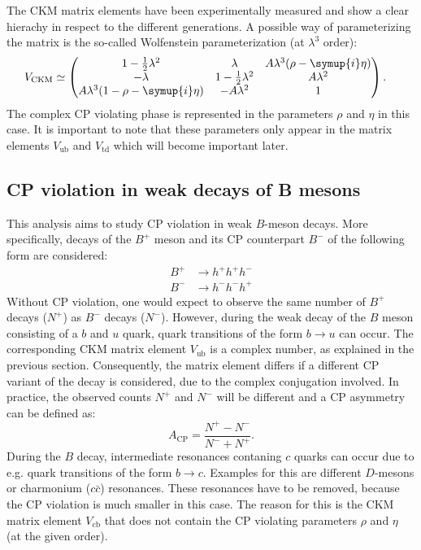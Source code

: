 The CKM matrix elements have been experimentally measured and show a clear hierachy in respect to the different generations. A possible way of parameterizing the matrix
is the so-called Wolfenstein parameterization (at $\lambda^3$ order):
\begin{align*}
    V_{\text{CKM}} & \simeq
    \begin{pmatrix}
        1-\frac{1}{2}\lambda^2 & \lambda & A\lambda^3(\rho-\symup{i}\eta) \\
        -\lambda & 1-\frac{1}{2}\lambda^2 & A\lambda^2 \\
        A\lambda^3(1-\rho-\symup{i}\eta) & -A\lambda^2 & 1 \\
    \end{pmatrix}.
\end{align*}
The complex CP violating phase is represented in the parameters $\rho$ and $\eta$ in this case. It is important to note that these parameters only appear in the matrix elements
$V_{\text{ub}}$ and $V_{\text{td}}$ which will become important later.

\subsection{CP violation in weak decays of B mesons}

This analysis aims to study CP violation in weak $B$-meson decays. More specifically, decays of the $B^+$ meson and its CP counterpart $B^-$ of the following form
are considered:
\begin{align*}
    B^+ &\rightarrow h^+ h^+ h^- \\
    B^- &\rightarrow h^- h^- h^+
\end{align*}
Without CP violation, one would expect to observe the same number of $B^+$ decays ($N^+$) as $B^-$ decays ($N^-$). However, during the weak decay of the
$B$ meson consisting of a $b$ and $u$ quark, quark transitions of the form $b \rightarrow u$ can occur. The corresponding CKM matrix element $V_{\text{ub}}$
is a complex number, as explained in the previous section. Consequently, the matrix element differs if a different CP variant of the decay is considered, due
to the complex conjugation involved. In practice, the observed counts $N^+$ and $N^-$ will be different and a CP asymmetry can be defined \cite{LHCbCPV} as:
\begin{equation}
    A_{\text{CP}} = \frac{N^+ - N^-}{N^- + N^+}.
    \label{eq:asymmetry}
\end{equation}
During the $B$ decay, intermediate resonances contaning $c$ quarks can occur due to e.g. quark transitions of the form $b \rightarrow c$. Examples for this are
different $D$-mesons or charmonium ($c \bar{c}$) resonances. These resonances have to be removed, because the CP violation is much smaller in this case. The reason for this is
the CKM matrix element $V_{\text{cb}}$ that does not contain the CP violating parameters $\rho$ and $\eta$ (at the given order).